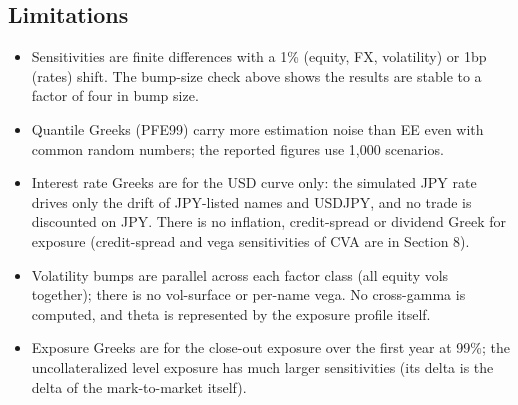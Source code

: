 \documentclass[11pt,letterpaper]{article}
\begin{document}
\subsection{Limitations}
\begin{itemize}
\item Sensitivities are finite differences with a 1\% (equity, FX, volatility) or 1bp (rates) shift. The bump-size check above shows the results are stable to a factor of four in bump size.
\item Quantile Greeks (PFE99) carry more estimation noise than EE even with common random numbers; the reported figures use 1,000 scenarios.
\item Interest rate Greeks are for the USD curve only: the simulated JPY rate drives only the drift of JPY-listed names and USDJPY, and no trade is discounted on JPY. There is no inflation, credit-spread or dividend Greek for exposure (credit-spread and vega sensitivities of CVA are in Section 8).
\item Volatility bumps are parallel across each factor class (all equity vols together); there is no vol-surface or per-name vega. No cross-gamma is computed, and theta is represented by the exposure profile itself.
\item Exposure Greeks are for the close-out exposure over the first year at 99\%; the uncollateralized level exposure has much larger sensitivities (its delta is the delta of the mark-to-market itself).
\end{itemize}
\end{document}
